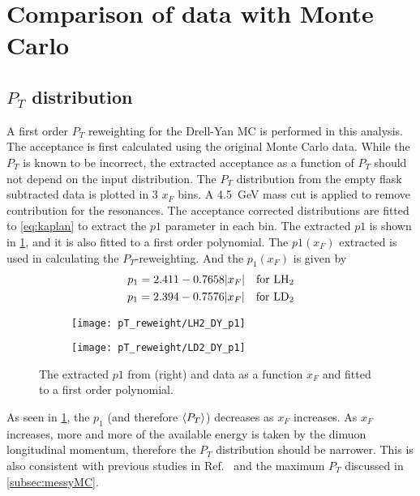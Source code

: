 \documentclass[../main.tex]{subfiles}
\begin{document}
\section{Comparison of data with Monte Carlo}

\subsection{\texorpdfstring{$P_T$}{P\_T} distribution}
A first order $P_T$ reweighting for the Drell-Yan MC is performed in this analysis. The acceptance is first
calculated using the original Monte Carlo data. While the $P_T$ is known to be incorrect,
the extracted acceptance as a function of $P_T$ should not depend on the input
distribution. The $P_T$ distribution from the empty flask subtracted data
is plotted in 3 $x_F$ bins. A \SI{4.5}{\GeV} mass cut is applied to remove contribution for the
resonances. The acceptance corrected distributions are fitted to \cref{eq:kaplan} to
extract the $p1$ parameter in each bin. The extracted $p1$ is shown in \cref{fig:p1_xF_DY},
and it is also fitted to a first order polynomial. The $p1(x_F)$ extracted is used in calculating
the $P_T$-reweighting. And the $p_1\left(x_F\right)$ is given by
\begin{equation}
	\begin{split}
		p_1 = 2.411 - 0.7658 \abs{x_F} \quad \text{for \ce{LH_2}} \\
		p_1 = 2.394 - 0.7576 \abs{x_F} \quad \text{for \ce{LD_2}}
	\end{split}
\end{equation}

\begin{figure}[h!]
	\centering
	\begin{subfigure}{0.45\linewidth}
		\texttt{[image: pT\_reweight/LH2\_DY\_p1]}
	\end{subfigure}
	\begin{subfigure}{0.45\linewidth}
		\texttt{[image: pT\_reweight/LD2\_DY\_p1]}
	\end{subfigure}
	\caption{The extracted $p1$ from (right) and  data as a function
		$x_F$ and fitted to a first order polynomial.}
	\label{fig:p1_xF_DY}
\end{figure}
As seen in \cref{fig:p1_xF_DY}, the $p_1$ (and therefore $\expval{P_T}$) decreases as $x_F$ increases.
As $x_F$ increases, more and more of the available energy is taken by the dimuon longitudinal momentum,
therefore the $P_T$ distribution should be narrower.
This is also consistent with previous studies in Ref.~\cite{prasad2020} and the maximum $P_T$ discussed in
\cref{subsec:messyMC}.
\end{document}
